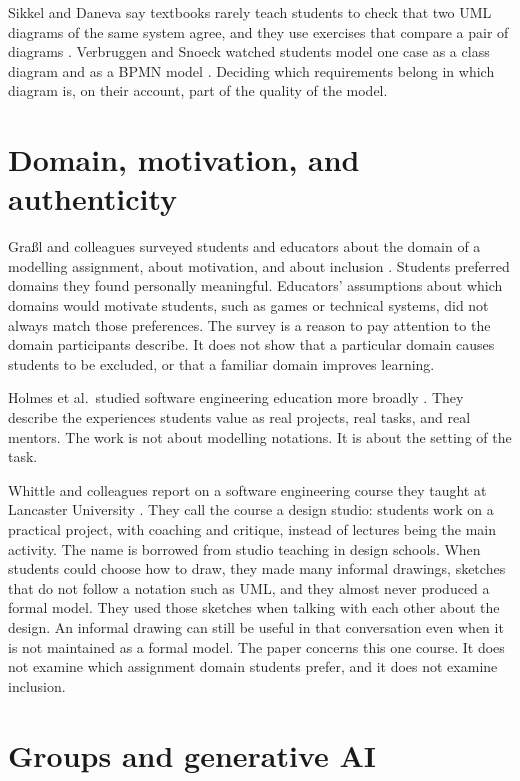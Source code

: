 Sikkel and Daneva say textbooks rarely teach students to check that two UML diagrams of the same system agree, and they use exercises that compare a pair of diagrams \cite{sikkel2010consistency}. Verbruggen and Snoeck watched students model one case as a class diagram and as a BPMN model \cite{verbruggen2022multiperspective}. Deciding which requirements belong in which diagram is, on their account, part of the quality of the model.

\section{Domain, motivation, and authenticity}
\label{sec:rw_human_context}

Gra{\ss}l and colleagues surveyed students and educators about the domain of a modelling assignment, about motivation, and about inclusion \cite{grassl2026dei}. Students preferred domains they found personally meaningful. Educators' assumptions about which domains would motivate students, such as games or technical systems, did not always match those preferences. The survey is a reason to pay attention to the domain participants describe. It does not show that a particular domain causes students to be excluded, or that a familiar domain improves learning.

Holmes et al.\ studied software engineering education more broadly \cite{holmes2018dimensions}. They describe the experiences students value as real projects, real tasks, and real mentors. The work is not about modelling notations. It is about the setting of the task.

Whittle and colleagues report on a software engineering course they taught at Lancaster University \cite{whittle2014studio}. They call the course a design studio: students work on a practical project, with coaching and critique, instead of lectures being the main activity. The name is borrowed from studio teaching in design schools. When students could choose how to draw, they made many informal drawings, sketches that do not follow a notation such as UML, and they almost never produced a formal model. They used those sketches when talking with each other about the design. An informal drawing can still be useful in that conversation even when it is not maintained as a formal model. The paper concerns this one course. It does not examine which assignment domain students prefer, and it does not examine inclusion.

\section{Groups and generative AI}
\label{sec:rw_groups_ai}

